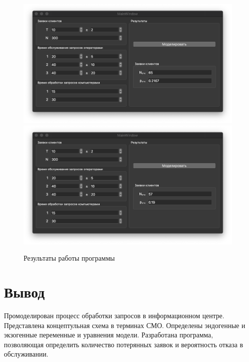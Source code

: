 \documentclass[a4paper,oneside,12pt]{extreport}
\begin{document}
\begin{figure}[H]
	\centering
	\includegraphics[width=\linewidth]{inc/img/result1.png}
	\includegraphics[width=\linewidth]{inc/img/result2.png}
	\caption{Результаты работы программы}
	\label{img:results-12}
\end{figure}

\chapter*{Вывод}

Промоделирован процесс обработки запросов в информационном центре.
Представлена концептульная схема в терминах СМО.
Определены эндогенные и экзогенные переменные и уравнения модели.
Разработана программа, позволяющая определить количество потерянных заявок и вероятность отказа в обслуживании.
\end{document}
